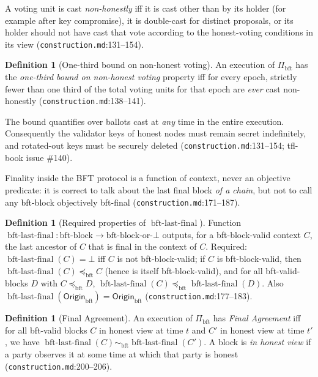 \documentclass[11pt,a4paper]{article}
\theoremstyle{definition}
\newtheorem{definition}[theorem]{Definition}
\begin{document}
A voting unit is cast \emph{non-honestly} iff it is cast other than by its
holder (for example after key compromise), it is double-cast for distinct
proposals, or its holder should not have cast that vote according to the
honest-voting conditions in its view (\texttt{construction.md}:131--154).

\begin{definition}[One-third bound on non-honest
voting]\label{def:xl-one-third}
An execution of $\Pi_{\mathrm{bft}}$ has the \emph{one-third bound on
non-honest voting} property iff for every epoch, strictly fewer than one
third of the total voting units for that epoch are \emph{ever} cast
non-honestly (\texttt{construction.md}:138--141).
\end{definition}

The bound quantifies over ballots cast at \emph{any} time in the entire
execution. Consequently the validator keys of honest nodes must remain
secret indefinitely, and rotated-out keys must be securely deleted
(\texttt{construction.md}:131--154; tfl-book issue \#140).

Finality inside the BFT protocol is a function of context, never an
objective predicate: it is correct to talk about the last final block
\emph{of a chain}, but not to call any bft-block objectively bft-final
(\texttt{construction.md}:171--187).

\begin{definition}[Required properties of
$\operatorname{bft\text{-}last\text{-}final}$]\label{def:xl-last-final}
Function $\operatorname{bft\text{-}last\text{-}final} :
\text{bft-block} \to \text{bft-block-or-}\bot$ outputs, for a
bft-block-valid context $C$, the last ancestor of $C$ that is final in the
context of $C$. Required:
$\operatorname{bft\text{-}last\text{-}final}(C) = \bot$ iff $C$ is not
bft-block-valid; if $C$ is bft-block-valid, then
$\operatorname{bft\text{-}last\text{-}final}(C) \preceq_{\mathrm{bft}} C$
(hence is itself bft-block-valid), and for all bft-valid-blocks $D$ with
$C \preceq_{\mathrm{bft}} D$,
$\operatorname{bft\text{-}last\text{-}final}(C) \preceq_{\mathrm{bft}}
\operatorname{bft\text{-}last\text{-}final}(D)$. Also
$\operatorname{bft\text{-}last\text{-}final}(\mathsf{Origin}_{\mathrm{bft}})
= \mathsf{Origin}_{\mathrm{bft}}$ (\texttt{construction.md}:177--183).
\end{definition}

\begin{definition}[Final Agreement]\label{def:xl-final-agreement}
An execution of $\Pi_{\mathrm{bft}}$ has \emph{Final Agreement} iff for
all bft-valid blocks $C$ in honest view at time $t$ and $C'$ in honest
view at time $t'$, we have $\operatorname{bft\text{-}last\text{-}final}(C)
\sim_{\mathrm{bft}} \operatorname{bft\text{-}last\text{-}final}(C')$. A
block is \emph{in honest view} if a party observes it at some time at
which that party is honest (\texttt{construction.md}:200--206).
\end{definition}
\end{document}
